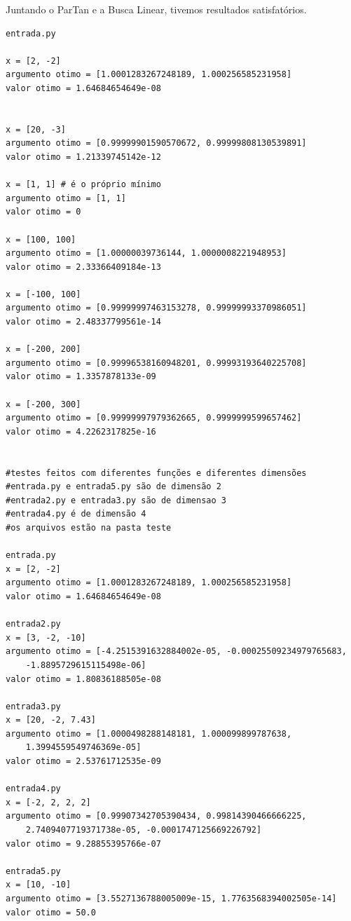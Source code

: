 \documentclass[12pt]{article}
\begin{document}
Juntando o ParTan e a Busca Linear, tivemos resultados satisfatórios.

\begin{verbatim}
entrada.py

x = [2, -2]
argumento otimo = [1.0001283267248189, 1.000256585231958]
valor otimo = 1.64684654649e-08


x = [20, -3]
argumento otimo = [0.99999901590570672, 0.99999808130539891]
valor otimo = 1.21339745142e-12

x = [1, 1] # é o próprio mínimo
argumento otimo = [1, 1]
valor otimo = 0

x = [100, 100]
argumento otimo = [1.00000039736144, 1.0000008221948953]
valor otimo = 2.33366409184e-13

x = [-100, 100]
argumento otimo = [0.99999997463153278, 0.99999993370986051]
valor otimo = 2.48337799561e-14

x = [-200, 200]
argumento otimo = [0.99996538160948201, 0.99993193640225708]
valor otimo = 1.3357878133e-09

x = [-200, 300]
argumento otimo = [0.99999997979362665, 0.9999999599657462]
valor otimo = 4.2262317825e-16


#testes feitos com diferentes funções e diferentes dimensões
#entrada.py e entrada5.py são de dimensão 2
#entrada2.py e entrada3.py são de dimensao 3
#entrada4.py é de dimensão 4
#os arquivos estão na pasta teste

entrada.py
x = [2, -2]
argumento otimo = [1.0001283267248189, 1.000256585231958]
valor otimo = 1.64684654649e-08

entrada2.py 
x = [3, -2, -10]
argumento otimo = [-4.2515391632884002e-05, -0.00025509234979765683, 
    -1.8895729615115498e-06]
valor otimo = 1.80836188505e-08

entrada3.py
x = [20, -2, 7.43]
argumento otimo = [1.0000498288148181, 1.000099899787638, 
    1.3994559549746369e-05]
valor otimo = 2.53761712535e-09

entrada4.py
x = [-2, 2, 2, 2]
argumento otimo = [0.99907342705390434, 0.99814390466666225, 
    2.7409407719371738e-05, -0.0001747125669226792]
valor otimo = 9.28855395766e-07

entrada5.py
x = [10, -10]
argumento otimo = [3.5527136788005009e-15, 1.7763568394002505e-14]
valor otimo = 50.0

\end{verbatim}

\end{document}
